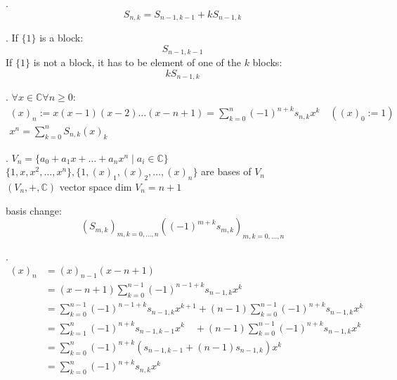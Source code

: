 \Theorem.
\[
  S_{n,k} = S_{n-1,k-1} + k S_{n-1,k}
\]

\Proof.
If $\{1\}$ is a block:
\[
  S_{n-1,k-1}
\]
If $\{1\}$ is not a block, it has to be element of one of the $k$ blocks:
\[
  k S_{n-1,k}
\]

\Theorem.
$\forall x\in \mathbb{C} \forall n ≥ 0:$
\begin{gather*}
  (x)_n
    := x(x-1)(x-2) \ldots(x-n+1)
    = \sum_{k=0}^{n} (-1)^{n+k} s_{n,k} x^k \quad ((x)_0:=1)
    \\
  x^n = \sum_{k=0}^{n} S_{n,k} (x)_k
\end{gather*}

\Remark.
$V_n = \{a_0 + a_1 x + \ldots + a_n x^n \mid a_i \in \mathbb{C} \}$ \\
$\{1,x,x^2, \ldots , x^n\}, \{1,(x)_1, (x)_2, \ldots ,(x)_n\}$ are bases of $V_n$ \\
$(V_n, +, \mathbb{C})$ vector space dim $V_n = n+1$

basis change:
\[
  (S_{m,k})_{m,k= 0, \ldots,n}
    ((-1)^{m+k} s_{m,k})_{m,k= 0, \ldots,n}
\]

\Proof.
\begin{align*}
  (x)_n
  &= (x)_{n-1} (x-n+1) \\
  &= (x-n+1) \sum_{k=0}^{n-1} (-1)^{n-1+k} s_{n-1,k} x^k \\
  &= \sum_{k=0}^{n-1} (-1)^{n-1+k} s_{n-1,k} x^{k+1}
    + (n-1)\sum_{k=0}^{n-1} (-1)^{n+k} s_{n-1,k} x^k \\
  &= \sum_{k=1}^n (-1)^{n+k} s_{n-1,k-1} x^k
    \quad + (n-1)\sum_{k=0}^{n-1} (-1)^{n+k} s_{n-1,k} x^k \\
  &= \sum_{k=0}^n (-1)^{n+k}
    (s_{n-1,k-1} + (n-1)s_{n-1,k}) x^k \\
  &= \sum_{k=0}^n (-1)^{n+k} s_{n,k} x^k \\
\end{align*}
